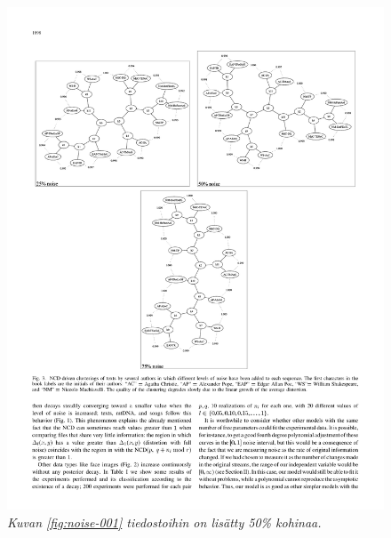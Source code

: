 \documentclass[12pt,finnish,final]{tktltiki2}
\theoremstyle{definition}
\theoremstyle{remark}
\begin{document}
    \begin{figure}[tb]
      \immediate{}
      \includegraphics{img/noise-002}
      \caption{\emph{Kuvan \ref{fig:noise-001} tiedostoihin on lisätty 50\% kohinaa.}
      \cite{4167725}}
      \label{fig:noise-002}
    \end{figure}
\end{document}

